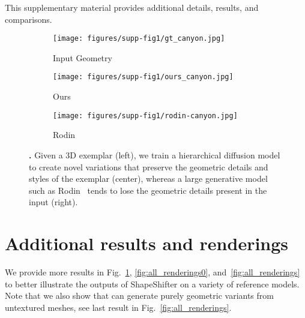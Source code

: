 \clearpage
\maketitlesupplementary

This supplementary material provides additional details, results, and comparisons.



\begin{figure}[h] \vspace*{-2mm}
\centering
        \begin{subfigure}{.32\linewidth}
        \centering
        \texttt{[image: figures/supp-fig1/gt\_canyon.jpg]}
        \caption{Input Geometry}
    \end{subfigure}
    \begin{subfigure}{.32\linewidth}
        \centering
        \texttt{[image: figures/supp-fig1/ours\_canyon.jpg]}
        \caption{Ours}
    \end{subfigure}
    \begin{subfigure}{.32\linewidth}
        \centering
        \texttt{[image: figures/supp-fig1/rodin-canyon.jpg]}
         \caption{Rodin}
    \end{subfigure}
    
        \vspace*{-2mm}   
        \caption{\textbf{\ourmethod.} Given a 3D exemplar (left), we train a hierarchical diffusion model to create novel variations that preserve the geometric details and styles of the exemplar (center), whereas a large generative model such as Rodin~\cite{zhang2024clay}
        tends to lose the geometric details present in the input (right).}
    \label{fig:ours_0}
      \vspace*{-3mm}   
\end{figure}


\section{Additional results and renderings}


We provide more results in Fig.~\ref{fig:ours_0}, \ref{fig:all_renderings0}, and~\ref{fig:all_renderings} to better illustrate the outputs of ShapeShifter on a variety of reference models. 
Note that we also show that \ourmethod can generate purely geometric variants from untextured meshes, see last result in Fig.~\ref{fig:all_renderings}.

